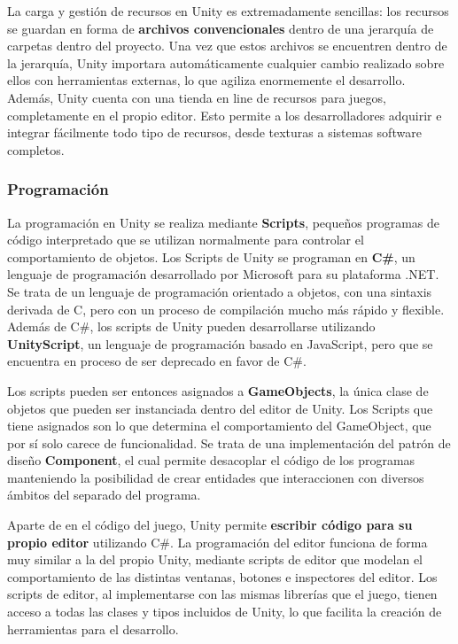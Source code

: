 La carga y gestión de recursos en Unity es extremadamente sencillas: los recursos se guardan en forma de \textbf{archivos convencionales} dentro de una jerarquía de carpetas dentro del proyecto. Una vez que estos archivos se encuentren dentro de la jerarquía, Unity importara automáticamente cualquier cambio realizado sobre ellos con herramientas externas, lo que agiliza enormemente el desarrollo. Además, Unity cuenta con una tienda en line de recursos para juegos, completamente en el propio editor. Esto permite a los desarrolladores adquirir e integrar fácilmente todo tipo de recursos, desde texturas a sistemas software completos. 

\subsubsection{Programación}
La programación en Unity se realiza mediante \textbf{Scripts}, pequeños programas de código interpretado que se utilizan normalmente para controlar el comportamiento de objetos. Los Scripts de Unity se programan en \textbf{C\#}, un lenguaje de programación desarrollado por Microsoft para su plataforma .NET. Se trata de un lenguaje de programación orientado a objetos, con una sintaxis derivada de C, pero con un proceso de compilación mucho más rápido y flexible. Además de C\#, los scripts de Unity pueden desarrollarse utilizando \textbf{UnityScript}, un lenguaje de programación basado en JavaScript, pero que se encuentra en proceso de ser deprecado en favor de C\#.

Los scripts pueden ser entonces asignados a \textbf{GameObjects}, la única clase de objetos que pueden ser instanciada dentro del editor de Unity. Los Scripts que tiene asignados son lo que determina el comportamiento del GameObject, que por sí solo carece de funcionalidad. Se trata de una implementación del patrón de diseño \textbf{Component}, el cual permite desacoplar el código de los programas manteniendo la posibilidad de crear entidades que interaccionen con diversos ámbitos del separado del programa.

Aparte de en el código del juego, Unity permite\textbf{ escribir código para su propio editor} utilizando C\#. La programación del editor funciona de forma muy similar a la del propio Unity, mediante scripts de editor que modelan el comportamiento de las distintas ventanas, botones e inspectores del editor. Los scripts de editor, al implementarse con las mismas librerías que el juego, tienen acceso a todas las clases y tipos incluidos de Unity, lo que facilita la creación de herramientas para el desarrollo.

